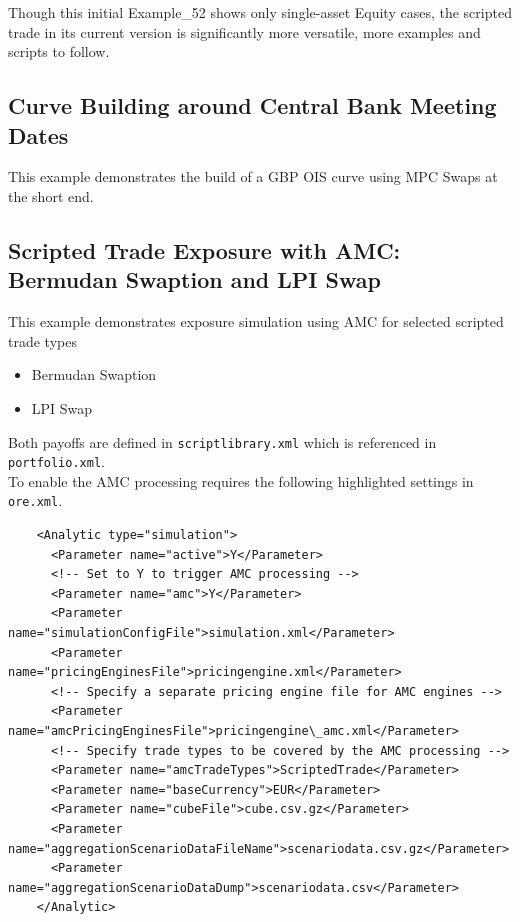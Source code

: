 Though this initial Example\_52 shows only single-asset Equity cases, the scripted trade in its current version is
  significantly more versatile, more examples and scripts to follow.

\subsection{Curve Building around Central Bank Meeting Dates}%
\label{example:53}

This example demonstrates the build of a GBP OIS curve using MPC Swaps at the short end.

\subsection{Scripted Trade Exposure with AMC: Bermudan Swaption and LPI Swap}%
\label{example:54}

This example demonstrates exposure simulation using AMC for selected scripted trade types
\begin{itemize}
\item Bermudan Swaption
\item LPI Swap
\end{itemize}
Both payoffs are defined in {\tt scriptlibrary.xml} which is referenced in {\tt portfolio.xml}. \\

To enable the AMC processing requires the following highlighted settings in {\tt ore.xml}.

\begin{verbatim}
    <Analytic type="simulation">
      <Parameter name="active">Y</Parameter>
      <!-- Set to Y to trigger AMC processing -->
      <Parameter name="amc">Y</Parameter>
      <Parameter name="simulationConfigFile">simulation.xml</Parameter>
      <Parameter name="pricingEnginesFile">pricingengine.xml</Parameter>
      <!-- Specify a separate pricing engine file for AMC engines -->
      <Parameter name="amcPricingEnginesFile">pricingengine\_amc.xml</Parameter>
      <!-- Specify trade types to be covered by the AMC processing -->
      <Parameter name="amcTradeTypes">ScriptedTrade</Parameter>
      <Parameter name="baseCurrency">EUR</Parameter>
      <Parameter name="cubeFile">cube.csv.gz</Parameter>
      <Parameter name="aggregationScenarioDataFileName">scenariodata.csv.gz</Parameter>
      <Parameter name="aggregationScenarioDataDump">scenariodata.csv</Parameter>
    </Analytic>
\end{verbatim}

